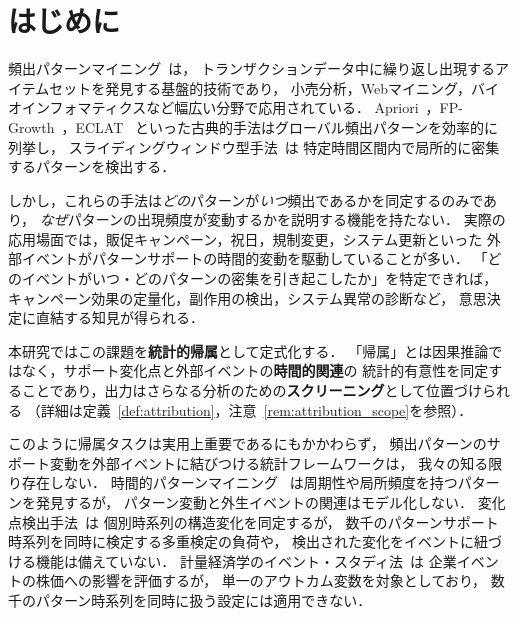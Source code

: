 \section{はじめに}\label{sec:intro}

頻出パターンマイニング~\cite{agrawal1994fast,han2000mining,fournier2017survey}は，
トランザクションデータ中に繰り返し出現するアイテムセットを発見する基盤的技術であり，
小売分析，Webマイニング，バイオインフォマティクスなど幅広い分野で応用されている．
Apriori~\cite{agrawal1994fast}，FP-Growth~\cite{han2000mining}，ECLAT~\cite{zaki2000scalable}
といった古典的手法はグローバル頻出パターンを効率的に列挙し，
スライディングウィンドウ型手法~\cite{dsaa2025}は
特定時間区間内で局所的に密集するパターンを検出する．

しかし，これらの手法は\emph{どの}パターンが\emph{いつ}頻出であるかを同定するのみであり，
\emph{なぜ}パターンの出現頻度が変動するかを説明する機能を持たない．
実際の応用場面では，販促キャンペーン，祝日，規制変更，システム更新といった
外部イベントがパターンサポートの時間的変動を駆動していることが多い．
「どのイベントがいつ・どのパターンの密集を引き起こしたか」を特定できれば，
キャンペーン効果の定量化，副作用の検出，システム異常の診断など，
意思決定に直結する知見が得られる．

本研究ではこの課題を\textbf{統計的帰属}として定式化する．
「帰属」とは因果推論ではなく，サポート変化点と外部イベントの\textbf{時間的関連}の
統計的有意性を同定することであり，出力はさらなる分析のための\textbf{スクリーニング}として位置づけられる
（詳細は定義~\ref{def:attribution}，注意~\ref{rem:attribution_scope}を参照）．

このように帰属タスクは実用上重要であるにもかかわらず，
頻出パターンのサポート変動を外部イベントに結びつける統計フレームワークは，
我々の知る限り存在しない．
時間的パターンマイニング~\cite{mahanta2005finding,tanbeer2009discovering,kiran2017discovering,fournier2021mining}
は周期性や局所頻度を持つパターンを発見するが，
パターン変動と外生イベントの関連はモデル化しない．
変化点検出手法~\cite{page1954continuous,aminikhanghahi2017survey}は
個別時系列の構造変化を同定するが，
数千のパターンサポート時系列を同時に検定する多重検定の負荷や，
検出された変化をイベントに紐づける機能は備えていない．
計量経済学のイベント・スタディ法~\cite{mackinlay1997event}は
企業イベントの株価への影響を評価するが，
単一のアウトカム変数を対象としており，
数千のパターン時系列を同時に扱う設定には適用できない．

